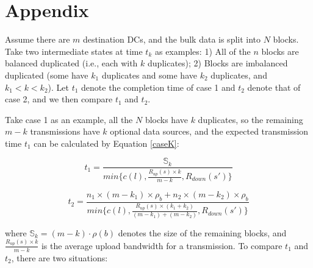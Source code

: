 \section{Appendix}
Assume there are $m$ destination DCs, and the bulk data is split into $N$ blocks.
Take two intermediate states at time $t_k$ as examples: 1) All of the $n$ blocks are balanced duplicated (i.e., each with $k$ duplicates); 2) Blocks are imbalanced duplicated (some have $k_1$ duplicates and some have $k_2$ duplicates, and $k_1<k<k_2$). Let $t_1$ denote the completion time of case 1 and $t_2$ denote that of case 2, and we then compare $t_1$ and $t_2$.
%
%

Take case 1 as an example, all the $N$ blocks have $k$ duplicates, so the remaining $m-k$ transmissions have $k$ optional data sources,
and the expected transmission time $t_1$ can be calculated by Equation \ref{caseK}:

\begin{equation}
\label{caseK}
t_1 = \frac{\mathbb{S}_k}{min\{c(l),\frac{R_{up}(s)\times k}{m-k},R_{down}(s')\}}
\end{equation}

\begin{equation}
\label{caseK}
t_2 = \frac{n_1\times(m-k_1)\times \rho_b + n_2\times(m-k_2)\times \rho_b} {min\{c(l),\frac{R_{up}(s)\times (k_1+k_2)}{(m-k_1)+(m-k_2)},R_{down}(s')\}}
\end{equation}

where $\mathbb{S}_k=(m-k)\cdot \rho(b)$ denotes the size of the remaining blocks, and $\frac{R_{up}(s)\times k}{m-k}$ is the average upload bandwidth for a transmission. To compare $t_1$ and $t_2$, there are two situations:


